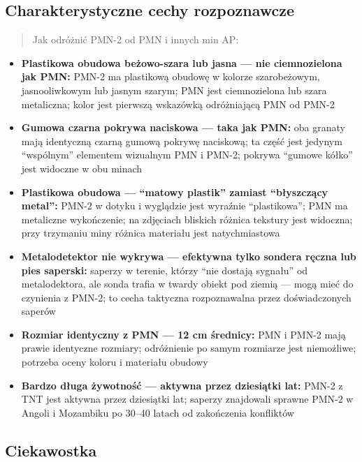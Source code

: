 \documentclass[12pt,oneside]{book}
\providecommand{\tightlist}{%
  \setlength{\itemsep}{0pt}\setlength{\parskip}{0pt}}
\begin{document}
\subsection{Charakterystyczne cechy
rozpoznawcze}\label{charakterystyczne-cechy-rozpoznawcze-123}

\begin{quote}
Jak odróżnić PMN-2 od PMN i innych min AP:
\end{quote}

\begin{itemize}
\tightlist
\item
  \textbf{Plastikowa obudowa beżowo-szara lub jasna --- nie
  ciemnozielona jak PMN:} PMN-2 ma plastikową obudowę w kolorze
  szarobeżowym, jasnooliwkowym lub jasnym szarym; PMN jest ciemnozielona
  lub szara metaliczna; kolor jest pierwszą wskazówką odróżniającą PMN
  od PMN-2
\item
  \textbf{Gumowa czarna pokrywa naciskowa --- taka jak PMN:} oba granaty
  mają identyczną czarną gumową pokrywę naciskową; ta część jest jedynym
  ``wspólnym'' elementem wizualnym PMN i PMN-2; pokrywa ``gumowe kółko''
  jest widoczne w obu minach
\item
  \textbf{Plastikowa obudowa --- ``matowy plastik'' zamiast ``błyszczący
  metal'':} PMN-2 w dotyku i wyglądzie jest wyraźnie ``plastikowa''; PMN
  ma metaliczne wykończenie; na zdjęciach bliskich różnica tekstury jest
  widoczna; przy trzymaniu miny różnica materiału jest natychmiastowa
\item
  \textbf{Metalodetektor nie wykrywa --- efektywna tylko sondera ręczna
  lub pies saperski:} saperzy w terenie, którzy ``nie dostają sygnału''
  od metalodektora, ale sonda trafia w twardy obiekt pod ziemią --- mogą
  mieć do czynienia z PMN-2; to cecha taktyczna rozpoznawalna przez
  doświadczonych saperów
\item
  \textbf{Rozmiar identyczny z PMN --- 12 cm średnicy:} PMN i PMN-2 mają
  prawie identyczne rozmiary; odróżnienie po samym rozmiarze jest
  niemożliwe; potrzeba oceny koloru i materiału obudowy
\item
  \textbf{Bardzo długa żywotność --- aktywna przez dziesiątki lat:}
  PMN-2 z TNT jest aktywna przez dziesiątki lat; saperzy znajdowali
  sprawne PMN-2 w Angoli i Mozambiku po 30--40 latach od zakończenia
  konfliktów
\end{itemize}

\subsection{Ciekawostka}\label{ciekawostka-123}
\end{document}
